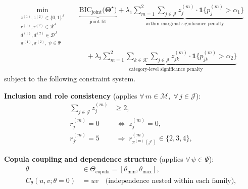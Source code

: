 \documentclass[letterpaper,8pt]{extarticle}  %
\begin{document}
\begin{doublespacing}
\begin{linenumbers}
\begin{subequations}\label{eq:mathprogram-full}
\begin{align}
  \min_{\substack{z^{(1)},z^{(2)} \in \{0,1\}^J \\[2pt]
          r^{(1)},r^{(2)} \in \mathcal{R}^J \\[2pt]
          d^{(1)},d^{(2)} \in \mathcal{D}^J \\[2pt]
          \pi^{(1)},\pi^{(2)},\; \psi \in \Psi}} \quad
    &\underbrace{\text{BIC}_{\text{joint}}\bigl(\boldsymbol\Theta^\star\bigr)}_{\text{joint fit}}
     + \underbrace{\lambda_1 \sum_{m=1}^{2} \sum_{j \in \mathcal{J}} z_j^{(m)} \cdot \mathbf{1}\bigl\{p_j^{(m)} > \alpha_1\bigr\}}_{\text{within-marginal significance penalty}} \nonumber\\
    &\quad + \underbrace{\lambda_2 \sum_{m=1}^{2} \sum_{k \in \mathcal{K}} \sum_{j \in \mathcal{J}} z_{jk}^{(m)} \cdot \mathbf{1}\bigl\{p_{jk}^{(m)} > \alpha_2\bigr\}}_{\text{category-level significance penalty}} \label{eq:mathprogram-full-obj}
\end{align}
\end{subequations}
subject to the following constraint system.

\noindent\textbf{Inclusion and role consistency} (applies $\forall\, m \in \mathcal{M},\; \forall\, j \in \mathcal{J}$):
\begin{align}
  \sum_{j \in \mathcal{J}} z_j^{(m)} &\geq 2, \label{eq:mathprogram-c1-v2}\\
  r_j^{(m)} = 0 &\;\Longleftrightarrow\; z_j^{(m)} = 0, \label{eq:mathprogram-c2-v2}\\
  r_{j'}^{(m)} = 5 &\;\Longrightarrow\; r_{\pi^{(m)}(j')}^{(m)} \in \{2,3,4\}, \label{eq:mathprogram-c3-v2}
\end{align}

\noindent\textbf{Copula coupling and dependence structure} (applies $\forall\, \psi \in \Psi$):
\begin{align}
  \theta &\in \Theta_{\text{copula}} = [\theta_{\min}, \theta_{\max}], \label{eq:mathprogram-c4}\\
  C_\theta(u,v; \theta=0) &= uv \quad\text{(independence nested within each family)}, \label{eq:mathprogram-c5}
\end{align}


\end{linenumbers}
\end{doublespacing}
\end{document}
